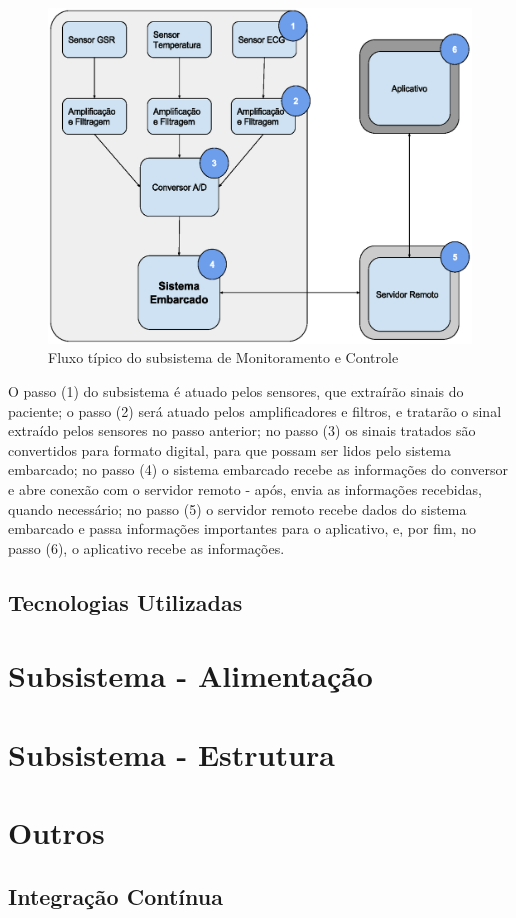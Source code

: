 \begin{figure}[H]
  \centering
    \includegraphics[width=\textwidth]{figuras/arquitetura-monitoramentoecontrole.eps}
  \caption{Fluxo típico do subsistema de Monitoramento e Controle}
  \label{fig:arquitetura-monitoramento-e-controle}
\end{figure}

O passo (1) do subsistema é atuado pelos sensores, que extraírão sinais do paciente;
o passo (2) será atuado pelos amplificadores e filtros, e tratarão o sinal
extraído pelos sensores no passo anterior; no passo (3) os sinais tratados
são convertidos para formato digital, para que possam ser lidos pelo sistema
embarcado; no passo (4) o sistema embarcado recebe as informações do conversor
e abre conexão com o servidor remoto - após, envia as informações recebidas,
quando necessário; no passo (5) o servidor remoto recebe dados do sistema
embarcado e passa informações importantes para o aplicativo, e, por fim,
no passo (6), o aplicativo recebe as informações.

\subsection{Tecnologias Utilizadas}

\section{Subsistema - Alimentação}

\section{Subsistema - Estrutura}

\section{Outros}

\subsection{Integração Contínua}
